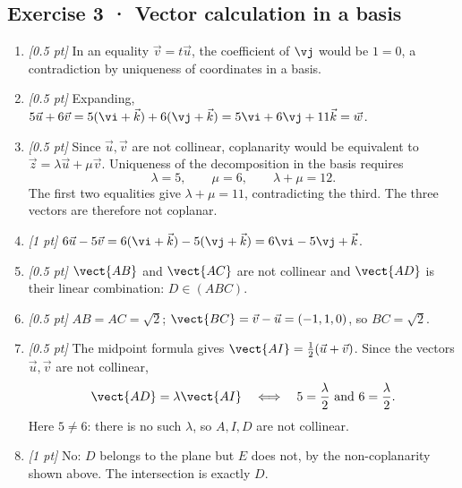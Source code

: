 \subsection*{Exercise 3 · Vector calculation in a basis}\begin{enumerate}

\item \textit{[0.5 pt]} In an equality $\vec v=t\vec u$, the coefficient of $\vj $ would be $1=0$, a contradiction by uniqueness of coordinates in a basis.

\item \textit{[0.5 pt]} Expanding, $5\vec u+6\vec v=5(\vi +\vec k)+6(\vj +\vec k)=5\vi +6\vj +11\vec k=\vec w$.

\item \textit{[0.5 pt]} Since $\vec u,\vec v$ are not collinear, coplanarity would be equivalent to $\vec z=\lambda\vec u+\mu\vec v$. Uniqueness of the decomposition in the basis requires
\[\lambda=5,\qquad\mu=6,\qquad\lambda+\mu=12.\]
The first two equalities give $\lambda+\mu=11$, contradicting the third. The three vectors are therefore not coplanar.

\item \textit{[1 pt]} $6\vec u-5\vec v=6(\vi +\vec k)-5(\vj +\vec k)=6\vi -5\vj +\vec k$.

\item \textit{[0.5 pt]} $\vect{AB}$ and $\vect{AC}$ are not collinear and $\vect{AD}$ is their linear combination: $D\in(ABC)$.

\item \textit{[0.5 pt]} $AB=AC=\sqrt2$; $\vect{BC}=\vec v-\vec u=(-1,1,0)$, so $BC=\sqrt2$.

\item \textit{[0.5 pt]} The midpoint formula gives $\vect{AI}=\frac12(\vec u+\vec v)$. Since the vectors $\vec u,\vec v$ are not collinear,
\[\vect{AD}=\lambda\vect{AI}\quad\Longleftrightarrow\quad 5=\frac{\lambda}{2}\ \text{and}\ 6=\frac{\lambda}{2}.\]
Here $5\ne 6$: there is no such $\lambda$, so $A,I,D$ are not collinear.

\item \textit{[1 pt]} No: $D$ belongs to the plane but $E$ does not, by the non-coplanarity shown above. The intersection is exactly $D$.

\end{enumerate}

